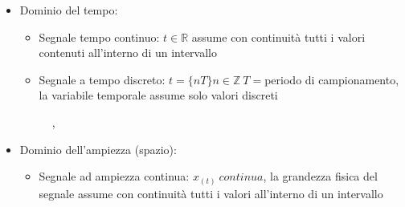         \begin{itemize}
            \item {Dominio del tempo:
                    \begin{itemize}
                        \item{Segnale tempo continuo: $t \in \mathbb{R}$ assume con continuità tutti i valori contenuti all'interno di un intervallo}
                        \item {Segnale a tempo discreto: $t = \{ nT \} n \in \mathbb{Z} \ T=$periodo di campionamento, la variabile temporale assume solo valori discreti}
                    \end{itemize}
                    \begin{figure}[h]
                        \centering
                        \caption{\color{purple}{tempo continuo}, \color{blue}{tempo discreto:$T=0.3$}}
                        \label{fig:Dominio del tempo}
                    \end{figure}                        
            }
            \item {Dominio dell'ampiezza (spazio):
                    \begin{itemize}
                        \item{Segnale ad ampiezza continua: $x_{(t)}\ continua$, la grandezza fisica del segnale assume con continuità tutti i valori all'interno di un intervallo}

\end{itemize}}
\end{itemize}
